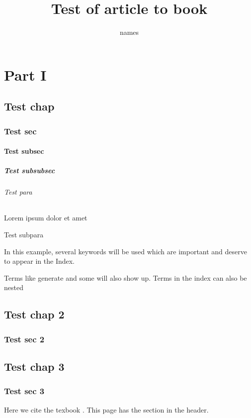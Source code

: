 \documentclass[titlepage]{article}
\title{Test of article to book}
\author{names}
\begin{document}
    \frontmatter
    \makeatletter
    \maketitle
    \makeatother
    \tableofcontents
    \listoffigures
    \listoftables
    
    \part{Part I}
    \chapter{Test chap}
    \section{Test sec}
    \subsection{Test subsec}
    \subsubsection{Test subsubsec}
    \paragraph{Test para} Lorem ipsum dolor et amet
    \subparagraph{Test subpara}
    In this example, several keywords will be used 
    which are important and deserve to appear in the Index.
    
    Terms like generate and some will also 
    show up. Terms in the index can also be nested 
    
    \chapter{Test chap 2}
    \section{Test sec 2}

    \mainmatter
    \chapter{Test chap 3}
    \section{Test sec 3}
    \clearpage
    Here we cite the texbook \cite{texbook}.
    \clearpage
    This page has the section in the header.
    
\end{document}
